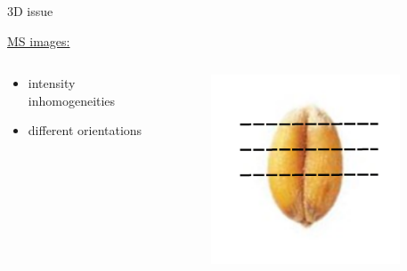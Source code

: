 \documentclass[10pt]{beamer}
\begin{document}
\begin{frame}{3D issue}
  
  \underline{MS images:}
  \begin{columns}
    \begin{column}[t]{0.9\textwidth}
      \begin{itemize}
      \item intensity inhomogeneities
      \item different orientations
      \end{itemize}
    \end{column}
    \begin{column}[t]{0.1\textwidth}
      \begin{figure}[ht]
        \centering
        \includegraphics[width=0.9\textwidth]{fig/cutwheatgrain}
        \caption{}
        \label{fig:cutwheatgrain}
      \end{figure}

    \end{column}
  \end{columns}
  


\end{frame}
\end{document}

